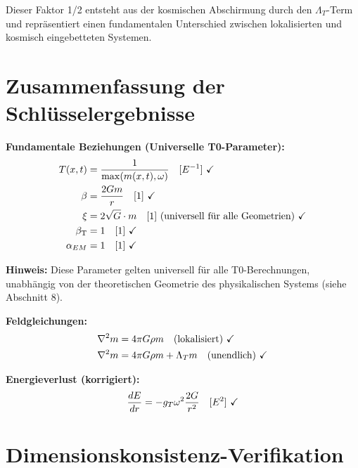 \documentclass[12pt,a4paper]{article}
\newcommand{\betaT}{\beta_{\text{T}}}
\begin{document}
	Dieser Faktor 1/2 entsteht aus der kosmischen Abschirmung durch den $\Lambda_T$-Term und repräsentiert einen fundamentalen Unterschied zwischen lokalisierten und kosmisch eingebetteten Systemen.
	
	\section{Zusammenfassung der Schlüsselergebnisse}
	\label{sec:key_results}
	
	\begin{tcolorbox}[colback=green!5!white,colframe=green!75!black,title=T0-Modellparameter (Alle dimensional konsistent)]
		
		\textbf{Fundamentale Beziehungen (Universelle T0-Parameter):}
		\begin{align}
			T(x,t) &= \frac{1}{\max(m(x,t), \omega)} \quad [E^{-1}] \text{ \checkmark} \\
			\beta &= \frac{2Gm}{r} \quad [1] \text{ \checkmark} \\
			\xi &= 2\sqrt{G} \cdot m \quad [1] \text{ (universell für alle Geometrien)} \text{ \checkmark} \\
			\betaT &= 1 \quad [1] \text{ \checkmark} \\
			\alpha_{EM} &= 1 \quad [1] \text{ \checkmark}
		\end{align}
		
		\textbf{Hinweis:} Diese Parameter gelten universell für alle T0-Berechnungen, unabhängig von der theoretischen Geometrie des physikalischen Systems (siehe Abschnitt 8).
		
		
		\textbf{Feldgleichungen:}
		\begin{align}
			\nabla^2 m &= 4\pi G \rho m \quad \text{(lokalisiert)} \text{ \checkmark} \\
			\nabla^2 m &= 4\pi G \rho m + \Lambda_T m \quad \text{(unendlich)} \text{ \checkmark}
		\end{align}
		
		\textbf{Energieverlust (korrigiert):}
		\begin{equation}
			\frac{dE}{dr} = -g_T \omega^2 \frac{2G}{r^2} \quad [E^2] \text{ \checkmark}
		\end{equation}
		
		
	\end{tcolorbox}
	
	\section{Dimensionskonsistenz-Verifikation}
	\label{sec:dimensional_verification}
	
\end{document}
